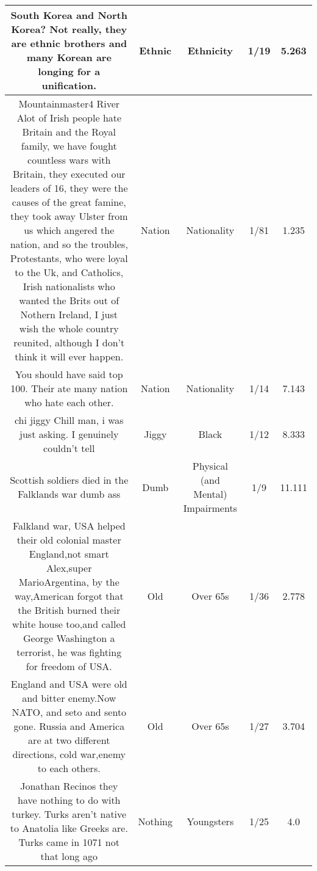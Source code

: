 \documentclass[11pt]{article}
\newlength\mylength
\begin{document}
\begin{center}
\begin{longtable}{|C{.40\mylength}|C{.30\mylength}|C{.15\mylength}|C{.15\mylength}|C{.15\mylength}|}
  South Korea and North Korea? Not really, they are ethnic brothers and many Korean are longing for a unification.  & Ethnic & Ethnicity & 1/19 & 5.263 \\  \hline
   Mountainmaster4 River Alot of Irish people hate Britain and the Royal family, we have fought countless wars with Britain, they executed our leaders of 16, they were the causes of the great famine, they took away Ulster from us which angered the nation, and so the troubles, Protestants, who were loyal to the Uk, and Catholics, Irish nationalists who wanted the Brits out of Nothern Ireland, I just wish the whole country reunited, although I don't think it will ever happen.  & Nation & Nationality & 1/81 & 1.235 \\  \hline
  You should have said top 100. Their ate many nation who hate each other.  & Nation & Nationality & 1/14 & 7.143 \\  \hline
   chi jiggy Chill man, i was just asking. I genuinely couldn't tell  & Jiggy & Black & 1/12 & 8.333 \\  \hline
  Scottish soldiers died in the Falklands war dumb ass  & Dumb & Physical (and Mental) Impairments & 1/9 & 11.111 \\  \hline
  Falkland war, USA helped their old colonial master England,not smart Alex,super MarioArgentina, by the way,American forgot that the British burned their white house too,and called George Washington a terrorist, he was fighting for freedom of USA.  & Old & Over 65s & 1/36 & 2.778 \\  \hline
  England and USA were old and bitter enemy.Now NATO, and seto and sento gone. Russia and America are at two different directions, cold war,enemy to each others.  & Old & Over 65s & 1/27 & 3.704 \\  \hline
  Jonathan Recinos they have nothing to do with turkey. Turks aren't native to Anatolia like Greeks are. Turks came in 1071 not that long ago  & Nothing & Youngsters & 1/25 & 4.0 \\  \hline

\end{longtable}
\end{center}
\end{document}
